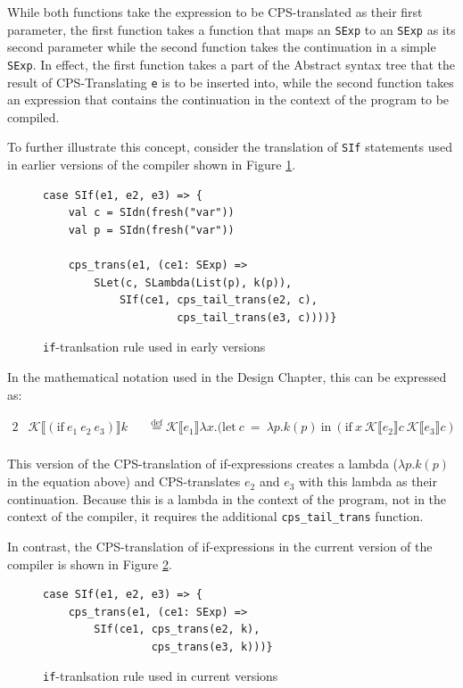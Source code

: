 \documentclass[11pt]{report}
\newcommand{\eqdef}{\stackrel{\text{def}}{=}}%
\newcommand{\cpstrans}[1]{\ensuremath{\mathcal{K}\llbracket #1 \rrbracket}}
\begin{document}
While both functions take the expression to be CPS-translated as their first parameter, the first function takes a function that maps an \texttt{SExp} to an \texttt{SExp} as its second parameter while the second function takes the continuation in a simple \texttt{SExp}. In effect, the first function takes a part of the Abstract syntax tree that the result of CPS-Translating \texttt{e} is to be inserted into, while the second function takes an expression that contains the continuation in the context of the program to be compiled.

To further illustrate this concept, consider the translation of \texttt{SIf} statements used in earlier versions of the compiler shown in Figure \ref{ifcpstrans}.

\begin{figure}[ht]
\begin{lstlisting}
case SIf(e1, e2, e3) => {
    val c = SIdn(fresh("var"))
    val p = SIdn(fresh("var"))
    
    cps_trans(e1, (ce1: SExp) =>
        SLet(c, SLambda(List(p), k(p)),
            SIf(ce1, cps_tail_trans(e2, c), 
                     cps_tail_trans(e3, c))))}
\end{lstlisting}
\caption{\texttt{if}-tranlsation rule used in early versions}
\label{ifcpstrans}
\end{figure}

In the mathematical notation used in the Design Chapter, this can be expressed as:

\begin{alignat*}{2}
&\cpstrans{(\text{if}\ e_1\ e_2\ e_3)} k &&\eqdef \cpstrans{e_1} \lambda x.(\text{let}~c~=~\lambda p.k(p)~\text{in}~(\text{if}\ x\ \cpstrans{e_2}c\ \cpstrans{e_3}c) \\
\end{alignat*}

This version of the CPS-translation of if-expressions creates a lambda ($\lambda p.k(p)$ in the equation above) and CPS-translates $e_2$ and $e_3$ with this lambda as their continuation. Because this is a lambda in the context of the program, not in the context of the compiler, it requires the additional \texttt{cps_tail_trans} function.

In contrast, the CPS-translation of if-expressions in the current version of the compiler is shown in Figure \ref{ifcpstranscurrent}.

\begin{figure}[ht]
\begin{lstlisting}
case SIf(e1, e2, e3) => {
    cps_trans(e1, (ce1: SExp) => 
        SIf(ce1, cps_trans(e2, k), 
                 cps_trans(e3, k)))}
\end{lstlisting}
\caption{\texttt{if}-tranlsation rule used in current versions}
\label{ifcpstranscurrent}
\end{figure}
\end{document}
